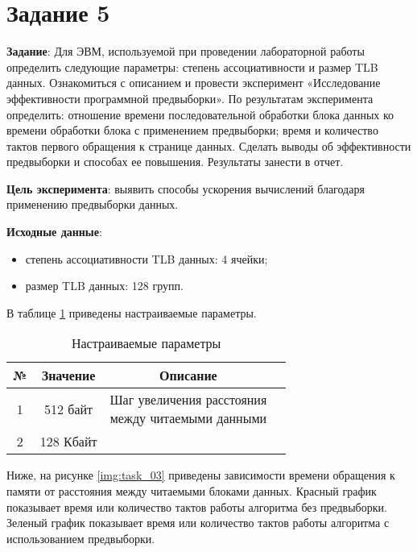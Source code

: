 \section*{Задание 5}

\textbf{Задание}: Для ЭВМ, используемой при проведении лабораторной работы определить следующие параметры: степень ассоциативности и размер TLB данных. Ознакомиться с описанием и провести эксперимент «Исследование эффективности программной предвыборки». По результатам эксперимента определить: отношение времени последовательной обработки блока данных ко времени обработки блока с применением предвыборки; время и количество тактов первого обращения к странице данных. Сделать выводы об эффективности предвыборки и способах ее повышения. Результаты занести в отчет.

\textbf{Цель эксперимента}: выявить способы ускорения вычислений благодаря применению предвыборки данных.

\textbf{Исходные данные}: 
\begin{itemize}
	\item степень ассоциативности TLB данных: 4 ячейки;
	\item размер TLB данных: 128 групп.
\end{itemize}

В таблице \ref{tab_5} приведены настраиваемые параметры.
\begin{table}[H]
	\begin{center}
		\caption{Настраиваемые параметры}
		\label{tab_5}
		\begin{tabular}{|c|c|c|c|}
		\hline
		№ & Значение & Описание 	\\
		\hline
		\hline
		1 & 512 байт & \specialcell{Шаг увеличения расстояния \\ между читаемыми данными} \\
		\hline
		2 & 128 Кбайт & \specialcell{Размер массива}		\\
		\hline
		\end{tabular}
	\end{center}
\end{table}

Ниже, на рисунке \ref{img:task_03} приведены зависимости времени обращения к памяти от расстояния между читаемыми блоками данных. Красный график показывает время или количество тактов работы алгоритма без предвыборки. Зеленый график показывает время или количество тактов работы алгоритма с использованием предвыборки.


